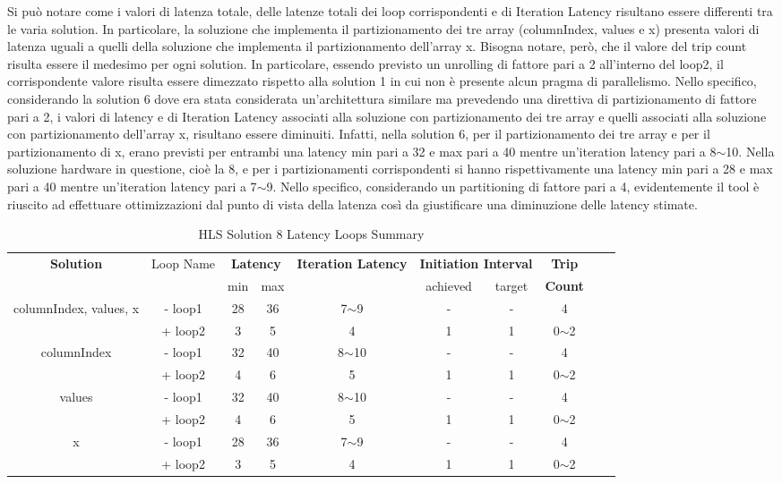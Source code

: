 Si può notare come i valori di latenza totale, delle latenze totali dei loop corrispondenti e di Iteration Latency risultano essere differenti tra le varia solution. In particolare, la soluzione che implementa il partizionamento dei tre array (columnIndex, values e x) presenta valori di latenza uguali a quelli della soluzione che implementa il partizionamento dell'array x. Bisogna notare, però, che il valore del trip count risulta essere il medesimo per ogni solution. In particolare, essendo previsto un unrolling di fattore pari a 2 all'interno del loop2, il corrispondente valore risulta essere dimezzato rispetto alla solution 1 in cui non è presente alcun pragma di parallelismo. Nello specifico, considerando la solution 6 dove era stata considerata un'architettura similare ma prevedendo una direttiva di partizionamento di fattore pari a 2, i valori di latency e di Iteration Latency associati alla soluzione con partizionamento dei tre array e quelli associati alla soluzione con partizionamento dell'array x, risultano essere diminuiti. Infatti, nella solution 6, per il partizionamento dei tre array e per il partizionamento di x, erano previsti per entrambi una latency min pari a 32 e max pari a 40 mentre un'iteration latency pari a 8$\sim$10. Nella soluzione hardware in questione, cioè la 8, e per i partizionamenti corrispondenti si hanno rispettivamente una latency min pari a 28 e max pari a 40 mentre un'iteration latency pari a 7$\sim$9. Nello specifico, considerando un partitioning di fattore pari a 4, evidentemente il tool è riuscito ad effettuare ottimizzazioni dal punto di vista della latenza così da giustificare una diminuzione delle latency stimate.

\begin{table}[H]
	\centering
	\begin{tabular}{|c|c|c|c|c|c|c|c|c|c|}
		\hline
		\multicolumn{1}{|c|}{\textbf{Solution}} & \multicolumn{1}{|c|}{Loop Name} & \multicolumn{2}{|c|}{\textbf{Latency}} & \multicolumn{1}{c|}{\textbf{Iteration Latency}} & \multicolumn{2}{c|}{\textbf{Initiation Interval}} & \multicolumn{1}{c|}{\textbf{Trip}}  \\
		&  & min & max & & achieved & target & \textbf{Count} \\
		\hline
		columnIndex, values, x & - loop1 & 28 & 36 & 7$\sim$9 & - & - & 4 \\
		& + loop2 & 3 & 5 & 4 & 1 & 1 & 0$\sim$2 \\
		\hline
		columnIndex & - loop1 & 32 & 40 & 8$\sim$10 & - & - & 4 \\
		& + loop2 & 4 & 6 & 5 & 1 & 1 & 0$\sim$2 \\
		\hline
		values & - loop1 & 32 & 40 & 8$\sim$10 & - & - & 4 \\
		& + loop2 & 4 & 6 & 5 & 1 & 1 & 0$\sim$2 \\
		\hline
		x & - loop1 & 28 & 36 & 7$\sim$9 & - & - & 4 \\
		& + loop2 & 3 & 5 & 4 & 1 & 1 & 0$\sim$2 \\
		\hline
	\end{tabular}
	\caption{HLS Solution 8 Latency Loops Summary }
	\label{tab:hls-solution-8-loop-summary}
\end{table}

